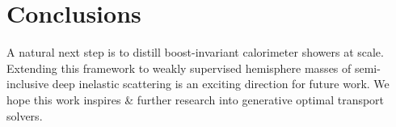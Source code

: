 \section{Conclusions}\label{sec:conclusions}

A natural next step is to distill boost-invariant calorimeter showers at
scale. Extending this framework to weakly supervised hemisphere masses
of semi-inclusive deep inelastic scattering is an exciting direction for
future work. We hope this work inspires & further research into generative
optimal transport solvers.

